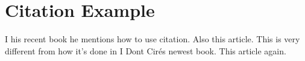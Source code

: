 \documentclass[11pt]{article}
\begin{document}
\section{Citation Example}

I his recent book he mentions how to use citation\cite{TEST:1}. Also this article\cite{ART:3}. This is very different from how it's done in I Dont Cir\'es newest book\cite{TEST:2}. This article again\cite{ART:3}. \cite{nakamoto2009bitcoin}

\newpage
 

\end{document}
